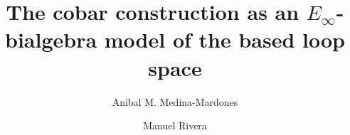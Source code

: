 \documentclass{amsart}
\title[The cobar construction as an $E_{\infty}$-bialgebra]{The cobar construction as an $E_{\infty}$-bialgebra model of the based loop space}
\author[A. Medina-Mardones]{Anibal M. Medina-Mardones}
\author[M. Rivera]{Manuel Rivera}
\begin{document}
	
	\maketitle
	
	
	
	
	
	
	
	\sloppy
    \printbibliography
\end{document}
